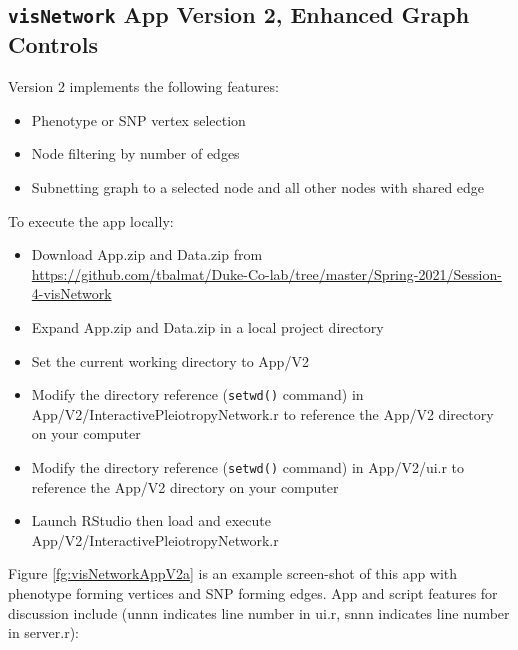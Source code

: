 \documentclass[10pt, letterpaper]{article}
\begin{document}
\begin{spacing}{1.0}

\subsection{\texttt{visNetwork} App Version 2, Enhanced Graph Controls}\label{sec:visNetworkV2}

Version 2 implements the following features:

\begin{itemize}[noitemsep]
    \item Phenotype or SNP vertex selection
    \item Node filtering by number of edges
    \item Subnetting graph to a selected node and all other nodes with shared edge
\end{itemize}

To execute the app locally:

\begin{itemize}[noitemsep]
    \item Download App.zip and Data.zip from\\ \url{https://github.com/tbalmat/Duke-Co-lab/tree/master/Spring-2021/Session-4-visNetwork}
    \item Expand App.zip and Data.zip in a local project directory
    \item Set the current working directory to App/V2
    \item Modify the directory reference (\texttt{setwd()} command) in App/V2/InteractivePleiotropyNetwork.r to reference the App/V2 directory on your computer
    \item Modify the directory reference (\texttt{setwd()} command) in App/V2/ui.r to reference the App/V2 directory on your computer
    \item Launch RStudio then load and execute App/V2/InteractivePleiotropyNetwork.r
\end{itemize}

Figure \ref{fg:visNetworkAppV2a} is an example screen-shot of this app with phenotype forming vertices and SNP forming edges.  App and script features for discussion include (unnn indicates line number in ui.r, snnn  indicates line number in server.r):


\end{spacing}
\end{document}

